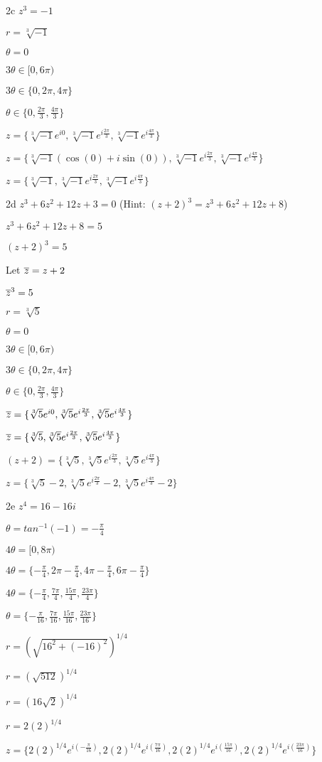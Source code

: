 \begin{question}{2c}
$z^3=-1$

$r = \sqrt[3]{-1}$

$\theta = 0$

$3\theta \in [0, 6\pi)$

$3\theta \in \{0, 2\pi, 4\pi\}$

$\theta \in \{0, \frac{2\pi}{3}, \frac{4\pi}{3}\}$

$z = \{\sqrt[3]{-1}e^{i0}, \sqrt[3]{-1}e^{i\frac{2\pi}{3}}, \sqrt[3]{-1}e^{i\frac{4\pi}{3}}\}$ 

$z = \{\sqrt[3]{-1}(\cos(0)+i\sin(0)), \sqrt[3]{-1}e^{i\frac{2\pi}{3}}, \sqrt[3]{-1}e^{i\frac{4\pi}{3}}\}$ 

$z = \{\sqrt[3]{-1}, \sqrt[3]{-1}e^{i\frac{2\pi}{3}}, \sqrt[3]{-1}e^{i\frac{4\pi}{3}}\}$ 

\end{question}
\begin{question}{2d}
$z^3 + 6z^2 + 12z + 3 = 0$ (Hint: $(z+2)^3 = z^3 + 6z^2 + 12z + 8$)

$z^3 + 6z^2 + 12z + 8 = 5$ 

$(z+2)^3 = 5$ 

Let $\overline{z} = z+2$

$\overline{z}^3 = 5$

$r = \sqrt[3]{5}$

$\theta = 0$

$3\theta \in [0, 6\pi)$

$3\theta \in \{0, 2\pi, 4\pi\}$

$\theta \in \{0, \frac{2\pi}{3}, \frac{4\pi}{3}\}$

$\overline{z} = \{\sqrt[3]{5}e^{i0}, \sqrt[3]{5}e^{i\frac{2\pi}{3}}, \sqrt[3]{5}e^{i\frac{4\pi}{3}}\}$ 

$\overline{z} = \{\sqrt[3]{5}, \sqrt[3]{5}e^{i\frac{2\pi}{3}}, \sqrt[3]{5}e^{i\frac{4\pi}{3}}\}$ 

$(z+2) = \{\sqrt[3]{5}, \sqrt[3]{5}e^{i\frac{2\pi}{3}}, \sqrt[3]{5}e^{i\frac{4\pi}{3}}\}$ 

$z = \{\sqrt[3]{5}-2, \sqrt[3]{5}e^{i\frac{2\pi}{3}}-2, \sqrt[3]{5}e^{i\frac{4\pi}{3}}-2\}$ 

\end{question}
\begin{question}{2e}
$z^4 = 16 - 16i$

$\theta = tan^{-1}(-1) = -\frac{\pi}{4}$

$4\theta = [0, 8\pi)$

$4\theta = \{-\frac{\pi}{4}, 2\pi-\frac{\pi}{4}, 4\pi -\frac{\pi}{4}, 6\pi -\frac{\pi}{4}\}$

$4\theta = \{-\frac{\pi}{4}, \frac{7\pi}{4}, \frac{15\pi}{4}, \frac{23\pi}{4}\}$

$\theta = \{-\frac{\pi}{16}, \frac{7\pi}{16}, \frac{15\pi}{16}, \frac{23\pi}{16}\}$

$r = (\sqrt{16^2+(-16)^2})^{1/4}$

$r = (\sqrt{512})^{1/4}$

$r = (16\sqrt{2})^{1/4}$

$r = 2(2)^{1/4}$

$z = \{2(2)^{1/4}e^{i(-\frac{\pi}{16})}, 2(2)^{1/4}e^{i(\frac{7\pi}{16})},  2(2)^{1/4}e^{i(\frac{15\pi}{16})},  2(2)^{1/4}e^{i(\frac{23\pi}{16})} \}$
\end{question}
